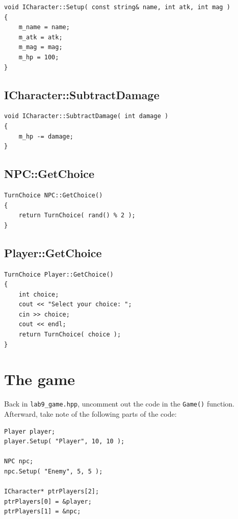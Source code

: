 \documentclass[a4paper,12pt,oneside]{book}
\begin{document}
\begin{lstlisting}[style=code]
void ICharacter::Setup( const string& name, int atk, int mag )
{
    m_name = name;
    m_atk = atk;
    m_mag = mag;
    m_hp = 100;
}
\end{lstlisting}

    \subsection{ICharacter::SubtractDamage}

\begin{lstlisting}[style=code]
void ICharacter::SubtractDamage( int damage )
{
    m_hp -= damage;
}
\end{lstlisting}

    \subsection{NPC::GetChoice}

\begin{lstlisting}[style=code]
TurnChoice NPC::GetChoice()
{
    return TurnChoice( rand() % 2 );
}
\end{lstlisting}

    \subsection{Player::GetChoice}

\begin{lstlisting}[style=code]
TurnChoice Player::GetChoice()
{
    int choice;
    cout << "Select your choice: ";
    cin >> choice;
    cout << endl;
    return TurnChoice( choice );
}
\end{lstlisting}




    \newpage{}


    \section{The game}
    
    Back in \texttt{lab9\_game.hpp}, uncomment out the code in the
    \texttt{Game()} function. Afterward, take note of the following
    parts of the code:

\begin{lstlisting}[style=code]
Player player;
player.Setup( "Player", 10, 10 );

NPC npc;
npc.Setup( "Enemy", 5, 5 );

ICharacter* ptrPlayers[2];
ptrPlayers[0] = &player;
ptrPlayers[1] = &npc;
\end{lstlisting}
\end{document}
